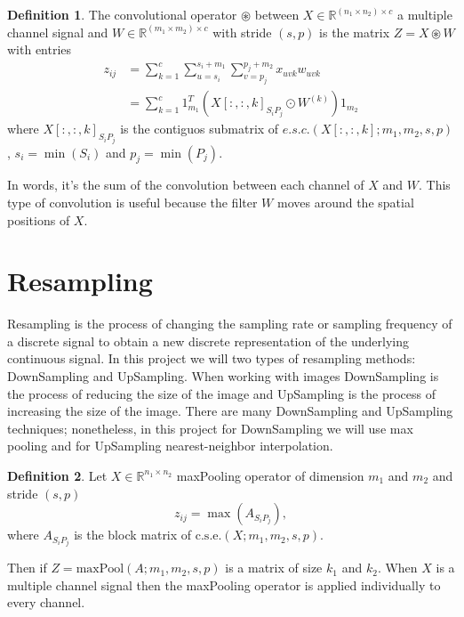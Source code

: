 \documentclass{article}
\theoremstyle{definition}
\newtheorem{definition}{Definition}
\begin{document}
\begin{definition}
The convolutional operator $\circledast$  between $X\in\mathbb{R}^{(n_1\times n_2)\times c}$ a multiple channel signal and $W\in\mathbb{R}^{(m_1\times m_2)\times c}$ with stride $(s,p)$ is the matrix $Z=X\circledast W$ with entries 
\begin{equation*}
\begin{split}
z_{ij} &=\sum_{k=1}^{c}\sum_{u=s_i}^{s_i+m_1}\sum_{v=p_j}^{p_j+m_2}x_{uvk}w_{uvk}\\
&=\sum_{k=1}^{c} 1_{m_1}^T(X[:,:,k]_{S_i P_j}\odot W^{(k)})1_{m_2}
\end{split}
\end{equation*}
where $X[:,:,k]_{S_i P_j}$ is the contiguos submatrix of  $e.s.c.(X[:,:,k];m_1,m_2,s,p)$, $s_i=\min(S_i)$ and $p_j=\min(P_j)$. 
\end{definition}
\noindent
In words, it's the sum of the convolution between each channel of $X$ and $W$. This type of convolution is useful because the filter $W$ moves around the spatial positions of $X$.

\section{Resampling}
Resampling is the process of changing the sampling rate or sampling frequency of a discrete signal to obtain a new discrete representation of the underlying continuous signal\cite{Oppenheim}. In this project we will two types of resampling methods: DownSampling and UpSampling. When working with images DownSampling is the process of reducing the size of the image and UpSampling is the process of increasing the size of the image. There are many DownSampling and UpSampling techniques; nonetheless, in this project for DownSampling we will use max pooling and for UpSampling nearest-neighbor interpolation.

\begin{definition}
Let $X\in\mathbb{R}^{n_1\times n_2}$  maxPooling operator of dimension $m_1$ and $m_2$ and stride $(s,p)$
\begin{equation}
z_{ij}=\max(A_{S_iP_j}),
\end{equation}
where $A_{S_iP_j}$ is the block matrix of $\mbox{c.s.e.}(X;m_1,m_2,s,p)$.
\end{definition}
Then if $Z = \mbox{maxPool}(A;m_1,m_2,s,p)$  is a matrix of size $k_1$ and $k_2$. When $X$ is a multiple channel signal then the maxPooling operator is applied individually to every channel.
\end{document}
